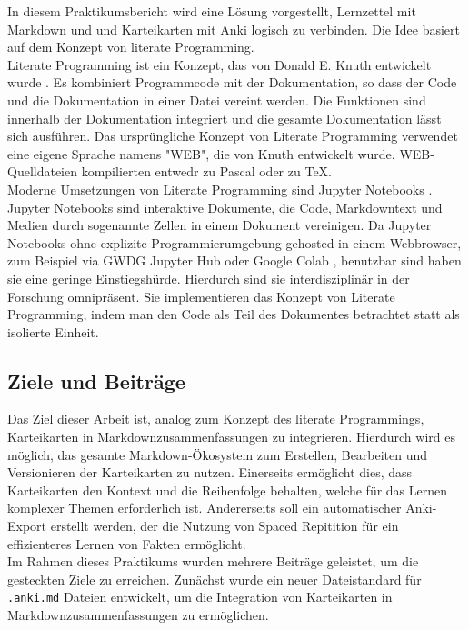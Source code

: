 \documentclass[ngerman]{article}
\begin{document}
\newpage

In diesem Praktikumsbericht wird eine Lösung vorgestellt, Lernzettel mit Markdown und und Karteikarten mit Anki logisch zu verbinden. Die Idee basiert auf dem Konzept von literate Programming.\\

Literate Programming ist ein Konzept, das von Donald E. Knuth entwickelt wurde \cite{LitProg}. Es kombiniert Programmcode mit der Dokumentation, so dass der Code und die Dokumentation in einer Datei vereint werden. Die Funktionen sind innerhalb der Dokumentation integriert und die gesamte Dokumentation lässt sich ausführen. Das ursprüngliche Konzept von Literate Programming verwendet eine eigene Sprache namens "WEB", die von Knuth entwickelt wurde. WEB-Quelldateien kompilierten entwedr zu Pascal oder zu \TeX \cite{WebIntroduction}.\\

Moderne Umsetzungen von Literate Programming sind Jupyter Notebooks \cite{Jupyter}. Jupyter Notebooks sind interaktive Dokumente, die Code, Markdowntext und Medien durch sogenannte Zellen in einem Dokument vereinigen. Da Jupyter Notebooks ohne explizite Programmierumgebung gehosted in einem Webbrowser, zum Beispiel via GWDG Jupyter Hub \cite{JupyterGWDG} oder Google Colab \cite{Colab}, benutzbar sind haben sie eine geringe Einstiegshürde. Hierdurch sind sie interdisziplinär in der Forschung omnipräsent. Sie implementieren das Konzept von Literate Programming, indem man den Code als Teil des Dokumentes betrachtet statt als isolierte Einheit.

\subsection{Ziele und Beitr\"age}
Das Ziel dieser Arbeit ist, analog zum Konzept des literate Programmings, Karteikarten in Markdownzusammenfassungen zu integrieren. Hierdurch wird es möglich, das gesamte Markdown-Ökosystem zum Erstellen, Bearbeiten und Versionieren der Karteikarten zu nutzen. Einerseits ermöglicht dies, dass Karteikarten den Kontext und die Reihenfolge behalten, welche für das Lernen komplexer Themen erforderlich ist. Andererseits soll ein automatischer Anki-Export erstellt werden, der die Nutzung von Spaced Repitition für ein effizienteres Lernen von Fakten ermöglicht.\\

Im Rahmen dieses Praktikums wurden mehrere Beiträge geleistet, um die gesteckten Ziele zu erreichen. Zunächst wurde ein neuer Dateistandard für \texttt{.anki.md} Dateien entwickelt, um die Integration von Karteikarten in Markdownzusammenfassungen zu ermöglichen.
\end{document}

